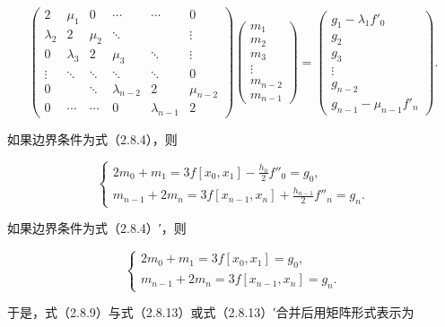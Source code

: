 \[\begin{pmatrix}
2&\mu_1&0&\cdots&\cdots&0\\
\lambda_2&2&\mu_2&\ddots&&\vdots\\
0&\lambda_3&2&\mu_3&\ddots&\vdots\\
\vdots&\ddots&\ddots&\ddots&\ddots&0\\
0&&\ddots&\lambda_{n-2}&2&\mu_{n-2}\\
0&\cdots&\cdots&0&\lambda_{n-1}&2
\end{pmatrix}
\begin{pmatrix}m_1\\m_2\\m_3\\\vdots\\m_{n-2}\\m_{n-1}\end{pmatrix}
=\begin{pmatrix}g_1-\lambda_1f'_0\\g_2\\g_3\\\vdots\\g_{n-2}\\g_{n-1}-\mu_{n-1}f'_n\end{pmatrix}.\tag{2.8.12}\]

如果边界条件为式（2.8.4），则

\[\begin{cases}
\displaystyle2m_0+m_1=3f[x_0,x_1]-\frac{h_0}2f''_0=g_0,\\[6pt]
\displaystyle m_{n-1}+2m_n=3f[x_{n-1},x_n]+\frac{h_{n-1}}2f''_n=g_n.
\end{cases}\tag{2.8.13}\]

如果边界条件为式（2.8.4）′，则

\[\begin{cases}
2m_0+m_1=3f[x_0,x_1]=g_0,\\
m_{n-1}+2m_n=3f[x_{n-1},x_n]=g_n.
\end{cases}\tag{2.8.13'}\]

于是，式（2.8.9）与式（2.8.13）或式（2.8.13）′合并后用矩阵形式表示为

